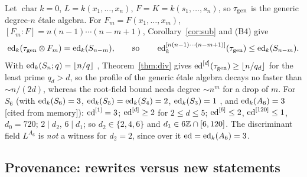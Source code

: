 \begin{example}\label{ex:Sn}
Let $\operatorname{char}k=0$, $L=k(x_1,\dots,x_n)$, $F=K=k(s_1,\dots,s_n)$, so
$\tau_{\mathrm{gen}}$ is the generic degree-$n$ \'etale algebra. For $F_m=F(x_1,\dots,x_m)$,
$[F_m:F]=n(n-1)\cdots(n-m+1)$, Corollary~\ref{cor:sub} and (B4) give
\[
\operatorname{ed}_k(\tau_{\mathrm{gen}}\otimes F_m)=\operatorname{ed}_k(S_{n-m}),\qquad\text{so}\qquad
\operatorname{ed}^{[n(n-1)\cdots(n-m+1)]}_k(\tau_{\mathrm{gen}})\le\operatorname{ed}_k(S_{n-m}).
\]
With $\operatorname{ed}_k(S_n;q)=\lfloor n/q\rfloor$ \cite{MR}, Theorem~\ref{thm:div} gives
$\operatorname{ed}^{[d]}(\tau_{\mathrm{gen}})\ge\lfloor n/q_d\rfloor$ for the least prime $q_d>d$, so the profile
of the generic \'etale algebra decays no faster than $\sim n/(2d)$, whereas the
root-field bound needs degree $\sim n^m$ for a drop of $m$. For $S_6$ (with
$\operatorname{ed}_k(S_6)=3$, $\operatorname{ed}_k(S_5)=\operatorname{ed}_k(S_4)=2$, $\operatorname{ed}_k(S_3)=1$ \cite{BR}, and
$\operatorname{ed}_k(A_6)=3$ [cited from memory]): $\operatorname{ed}^{[1]}=3$; $\operatorname{ed}^{[d]}\ge2$ for $2\le d\le5$;
$\operatorname{ed}^{[6]}\le2$, $\operatorname{ed}^{[120]}\le1$, $d_0=720$; $2\mid d_2$, $6\mid d_1$; so
$d_2\in\{2,4,6\}$ and $d_1\in6\mathbb Z\cap[6,120]$. The discriminant field $L^{A_6}$ is
\emph{not} a witness for $d_2=2$, since over it $\operatorname{ed}=\operatorname{ed}_k(A_6)=3$.
\end{example}

\subsection{Provenance: rewrites versus new statements}\label{ss:prov}

